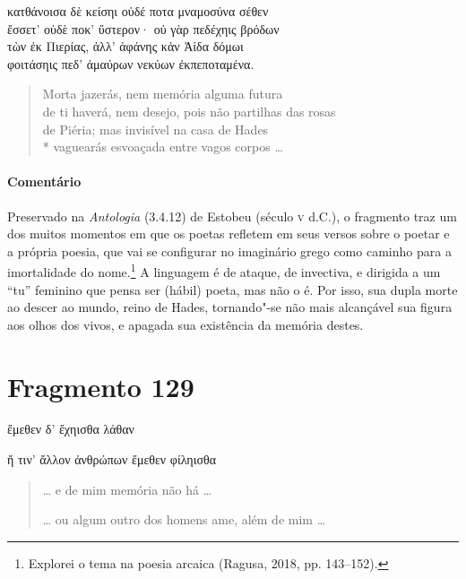 \begin{gkverse}
κατθάνοισα δὲ κείσηι οὐδέ ποτα μναμοσύνα σέθεν\\
ἔσσετ’ οὐδὲ \dagger{}ποκ’\dagger{} ὔστερον· οὐ γὰρ πεδέχηις βρόδων\\
τὼν ἐκ Πιερίας, ἀλλ’ ἀφάνης κἀν Ἀίδα δόμωι\\
φοιτάσηις πεδ’ ἀμαύρων νεκύων ἐκπεποταμένα.
\end{gkverse}

\begin{verse}
Morta jazerás, nem memória alguma futura\\
de ti haverá, nem desejo, pois não partilhas das rosas\\
de Piéria; mas invisível na casa de Hades\\*
vaguearás esvoaçada entre vagos corpos \ldots{}
\end{verse}

{\paragraph{Comentário} Preservado na \textit{Antologia} (3.4.12) de Estobeu (século \textsc{v} d.C.), o fragmento traz um dos muitos momentos em que os poetas refletem em seus versos
sobre o poetar e a própria poesia, que vai se configurar no imaginário grego
como caminho para a imortalidade do nome.\footnote{Explorei o tema na poesia arcaica (Ragusa, 2018, pp. 143--152).} A linguagem é de ataque, de
invectiva, e dirigida a um “tu” feminino que pensa ser (hábil) poeta, mas
não o é. Por isso, sua dupla morte ao descer ao mundo, reino de
Hades, tornando"-se não mais alcançável sua figura aos olhos dos vivos, e
apagada sua existência da memória destes.}



\pagebreak
\section{Fragmento 129}

\begin{gkverse}
ἔμεθεν δ’ ἔχηισθα λάθαν

\ast\quad\ast\quad\ast

ἤ τιν’ ἄλλον ἀνθρώπων ἔμεθεν φίληισθα

\end{gkverse}

\begin{verse}
\ldots{} e de mim memória não há \ldots{}

\ast\quad\ast\quad\ast

\ldots{} ou algum outro dos homens ame, além de mim \ldots{}
\end{verse}

